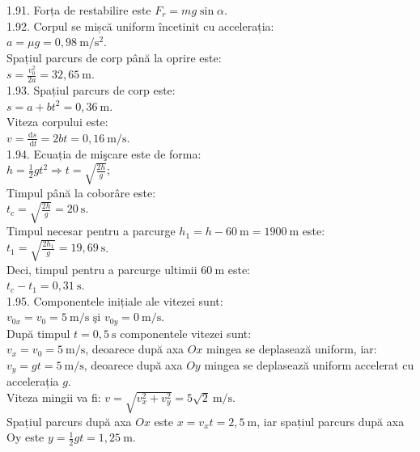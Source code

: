 1.91. Forța de restabilire este $F_{r}=m g \sin \alpha$.\\

1.92. Corpul se mișcă uniform încetinit cu accelerația:\\ $a=\mu g=0,98 \mathrm{~m} / \mathrm{s}^{2}$.\\ Spațiul parcurs de corp până la oprire este:\\ $s=\frac{v_{0}^{2}}{2 a}=32,65 \mathrm{~m}$.\\

1.93. Spațiul parcurs de corp este:\\ $s=a+b t^{2}=0,36 \mathrm{~m}$.\\ Viteza corpului este:\\ $v=\frac{\mathrm{d} s}{\mathrm{~d} t}=2 b t=0,16 \mathrm{~m} / \mathrm{s}$.\\

1.94. Ecuația de mişcare este de forma:\\ $h=\frac{1}{2} g t^{2} \Rightarrow t=\sqrt{\frac{2 h}{g}}$;\\ Timpul până la coborâre este:\\ $t_{c}=\sqrt{\frac{2 h}{g}}=20 \mathrm{~s}$.\\ Timpul necesar pentru a parcurge $h_{1}=h-60 \mathrm{~m}=1900 \mathrm{~m}$ este:\\ $t_{1}=\sqrt{\frac{2 h_{1}}{g}}=19,69 \mathrm{~s}$.\\ Deci, timpul pentru a parcurge ultimii $60 \mathrm{~m}$ este:\\ $t_{c}-t_{1}=0,31 \mathrm{~s}$.\\

1.95. Componentele inițiale ale vitezei sunt:\\ $v_{0 x}=v_{0}=5 \mathrm{~m} / \mathrm{s} \text { şi } v_{0 y}=0 \mathrm{~m} / \mathrm{s}$.\\ După timpul $t=0,5 \mathrm{~s}$ componentele vitezei sunt:\\ $v_{x}=v_{0}=5 \mathrm{~m} / \mathrm{s}$, deoarece după axa $O x$ mingea se deplasează uniform, iar:\\ $v_{y}=g t=5 \mathrm{~m} / \mathrm{s}$, deoarece după axa $O y$ mingea se deplasează uniform accelerat cu accelerația $g$.\\ Viteza mingii va fi: $v=\sqrt{v_{x}^{2}+v_{y}^{2}}=5 \sqrt{2} \mathrm{~m} / \mathrm{s}$.\\ Spațiul parcurs după axa $O x$ este $x=v_{x} t=2,5 \mathrm{~m}$, iar spațiul parcurs după axa Oy este $y=\frac{1}{2} g t=1,25 \mathrm{~m}$.\\

